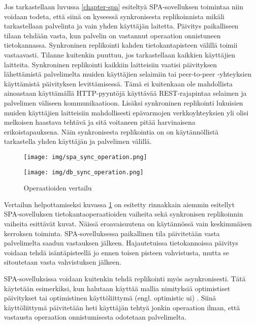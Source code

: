 \documentclass[finnish,twoside,censored,csm,sw-track-2018]{HYthesisML}
\begin{document}
Jos tarkastellaan luvussa \ref{chapter-spa} esiteltyä SPA-sovelluksen toimintaa niin voidaan todeta, että siinä on kyseessä synkronisesta replikoinnista mikäli tarkastellaan palvelinta ja vain yhden käyttäjän laitetta. Päivitys paikalliseen tilaan tehdään vasta, kun palvelin on vastannut operaation onnistuneen tietokannassa. Synkroninen replikointi kahden tietokantapisteen välillä toimii vastaavasti. Tilanne kuitenkin puuttuu, jos tarkastellaan kaikkien käyttäjien laitteita. Synkroninen replikointi kaikkiin laitteisiin vaatisi päivityksen lähettämistä palvelimelta muiden käyttäjien selaimiin tai peer-to-peer -yhteyksien käyttämistä päivityksen levittämisessä. Tämä ei kuitenkaan ole mahdollista ainoastaan käyttämällä HTTP-pyyntöjä käyttävää REST-rajapintaa selaimen ja palvelimen väliseen kommunikaatioon. Lisäksi synkroninen replikointi lukuisien muiden käyttäjien laitteisiin mahdollisesti epävarmojen verkkoyhteyksien yli olisi melkoisen haastava tehtävä ja sitä voitaneen pitää harvinaisena erikoistapauksena. Näin synkronisesta replikointia on on käytännöllistä tarkastella yhden käyttäjän ja palvelimen välillä.

\begin{figure}[ht]
\centering
\begin{minipage}{.5\textwidth}
  \centering
  \texttt{[image: img/spa\_sync\_operation.png]}
\end{minipage}%
\begin{minipage}{.5\textwidth}
  \centering
  \texttt{[image: img/db\_sync\_operation.png]}
\end{minipage}
\caption{Operaatioiden vertailu}
\label{fig-operaatioiden-vertailu}
\end{figure}

Vertailun helpottamiseksi kuvassa \ref{fig-operaatioiden-vertailu} on esitetty rinnakkain aiemmin esitellyt SPA-sovelluksen tietokantaoperaatioiden vaiheita sekä synkronisen replikoinnin vaiheita esittävät kuvat. Näissä eroavaisuutena on käytännössä vain keskimmäisen kerroksen toiminta. SPA-sovelluksessa paikallinen tila päivitetään vasta palvelimelta saadun vastauksen jälkeen. Hajautetuissa tietokannoissa päivitys voidaan tehdä isäntäpisteellä jo ennen toisen pisteen vahvistusta, mutta se sitoutetaan vasta vahvistuksen jälkeen.

SPA-sovelluksissa voidaan kuitenkin tehdä replikointi myös asynkronisesti. Tätä käytetään esimerkiksi, kun halutaan käyttää mallia nimityksiä optimistiset päivitykset tai optimistinen käyttöliittymä (engl. optimistic ui) \citep{optimistic-ui}. Siinä käyttöliittymä päivitetään heti käyttäjän tehtyä jonkin operaation ilman, että vastausta operaation onnistumisesta odotetaan palvelimelta.
\end{document}

